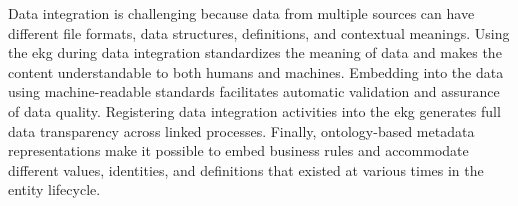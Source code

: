 %
%
Data integration is challenging because data from multiple sources can have different file formats, data structures,
definitions, and contextual meanings.
Using the \gls{ekg} during data integration standardizes the meaning of data and makes the content understandable
to both humans and machines.
Embedding  into the data using machine-readable standards facilitates
automatic validation and assurance of data quality.
Registering data integration activities into the \gls{ekg} generates full data transparency across
linked processes.
Finally, ontology-based metadata representations make it possible to embed business rules and accommodate
different values, identities, and definitions that existed at various times in the entity lifecycle.
